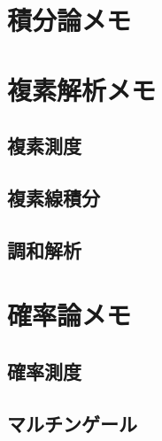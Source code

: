 \documentclass[a4j,10.5pt,oneside,openany]{jsbook}
\theoremstyle{mystyle}
\begin{document}
\chapter{積分論メモ}
	
	
	
	
	
	
	
	
	
	
	

\chapter{複素解析メモ}
	\section{複素測度}
		
		
		
	\section{複素線積分}
		
		
		
		
		
		
		
		
		
		
		
		
	\section{調和解析}
		
%

\chapter{確率論メモ}
	\section{確率測度}
		
		
		
		
	\section{マルチンゲール}
		
		
		
\end{document}
